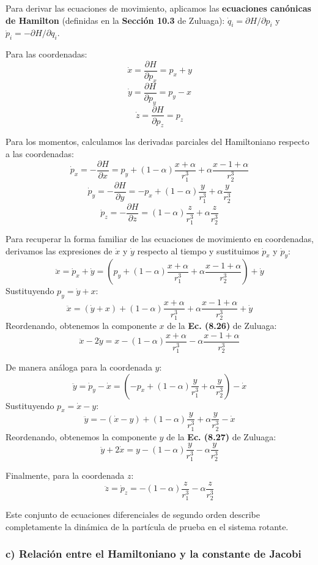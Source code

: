 \documentclass[a4paper]{article}
\begin{document}
Para derivar las ecuaciones de movimiento, aplicamos las \textbf{ecuaciones canónicas de Hamilton} (definidas en la \textbf{Sección 10.3} de Zuluaga): $\dot{q}_i = \partial H / \partial p_i$ y $\dot{p}_i = -\partial H / \partial q_i$.

Para las coordenadas:
$$\dot{x} = \frac{\partial H}{\partial p_x} = p_x + y$$
$$\dot{y} = \frac{\partial H}{\partial p_y} = p_y - x$$
$$\dot{z} = \frac{\partial H}{\partial p_z} = p_z$$

Para los momentos, calculamos las derivadas parciales del Hamiltoniano respecto a las coordenadas:
$$\dot{p}_x = -\frac{\partial H}{\partial x} = p_y + (1-\alpha)\frac{x+\alpha}{r_1^3} + \alpha\frac{x-1+\alpha}{r_2^3}$$
$$\dot{p}_y = -\frac{\partial H}{\partial y} = -p_x + (1-\alpha)\frac{y}{r_1^3} + \alpha\frac{y}{r_2^3}$$
$$\dot{p}_z = -\frac{\partial H}{\partial z} = (1-\alpha)\frac{z}{r_1^3} + \alpha\frac{z}{r_2^3}$$

Para recuperar la forma familiar de las ecuaciones de movimiento en coordenadas, derivamos las expresiones de $\dot{x}$ y $\dot{y}$ respecto al tiempo y sustituimos $\dot{p}_x$ y $\dot{p}_y$:
$$\ddot{x} = \dot{p}_x + \dot{y} = \left( p_y + (1-\alpha)\frac{x+\alpha}{r_1^3} + \alpha\frac{x-1+\alpha}{r_2^3} \right) + \dot{y}$$
Sustituyendo $p_y = \dot{y} + x$:
$$\ddot{x} = (\dot{y} + x) + (1-\alpha)\frac{x+\alpha}{r_1^3} + \alpha\frac{x-1+\alpha}{r_2^3} + \dot{y}$$
Reordenando, obtenemos la componente $x$ de la \textbf{Ec. (8.26)} de Zuluaga:
$$\ddot{x} - 2\dot{y} = x - (1-\alpha)\frac{x+\alpha}{r_1^3} - \alpha\frac{x-1+\alpha}{r_2^3}$$

De manera análoga para la coordenada $y$:
$$\ddot{y} = \dot{p}_y - \dot{x} = \left( -p_x + (1-\alpha)\frac{y}{r_1^3} + \alpha\frac{y}{r_2^3} \right) - \dot{x}$$
Sustituyendo $p_x = \dot{x} - y$:
$$\ddot{y} = -(\dot{x} - y) + (1-\alpha)\frac{y}{r_1^3} + \alpha\frac{y}{r_2^3} - \dot{x}$$
Reordenando, obtenemos la componente $y$ de la \textbf{Ec. (8.27)} de Zuluaga:
$$\ddot{y} + 2\dot{x} = y - (1-\alpha)\frac{y}{r_1^3} - \alpha\frac{y}{r_2^3}$$

Finalmente, para la coordenada $z$:
$$\ddot{z} = \dot{p}_z = -(1-\alpha)\frac{z}{r_1^3} - \alpha\frac{z}{r_2^3}$$

Este conjunto de ecuaciones diferenciales de segundo orden describe completamente la dinámica de la partícula de prueba en el sistema rotante.

\subsubsection*{c) Relación entre el Hamiltoniano y la constante de Jacobi}
\end{document}
